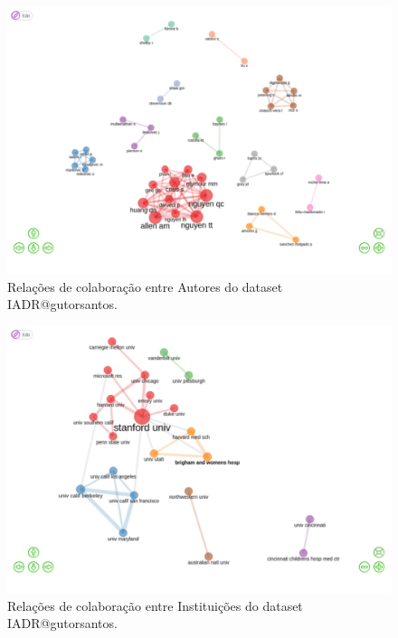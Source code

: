 \begin{figure}[H]
    \centering
\includegraphics[angle=0,width=1\textwidth]{experiments/gutorsantos/AnaliseBibliometrica/IAeDiscriminacao/imgs/CollaborationAuthors.png}
    \caption{Relações de colaboração entre Autores do dataset IADR@gutorsantos.}
    \label{fig:IADR@gutorsantos:CollabAuthor}
\end{figure}

\begin{figure}[H]
    \centering
\includegraphics[angle=0,width=1\textwidth]{experiments/gutorsantos/AnaliseBibliometrica/IAeDiscriminacao/imgs/CollaborationInst.png}
    \caption{Relações de colaboração entre Instituições do dataset IADR@gutorsantos.}
    \label{fig:IADR@gutorsantos:CollabInst}
\end{figure}

